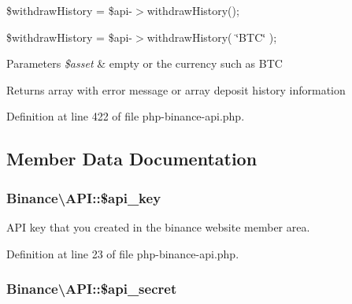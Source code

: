 \$withdraw\-History = \$api-\/$>$withdraw\-History();

\$withdraw\-History = \$api-\/$>$withdraw\-History( \char`\"{}\-B\-T\-C\char`\"{} );


\begin{DoxyParams}{Parameters}
{\em \$asset} & empty or the currency such as B\-T\-C \\
\hline
\end{DoxyParams}
\begin{DoxyReturn}{Returns}
array with error message or array deposit history information 
\end{DoxyReturn}


Definition at line 422 of file php-\/binance-\/api.\-php.



\subsection{Member Data Documentation}
\hypertarget{classBinance_1_1API_a4b70fc1796d52440e44423da2cbafca5}{
\subsubsection[{\$api\-\_\-key}]{\setlength{\rightskip}{0pt plus 5cm}Binance\textbackslash{}\-A\-P\-I\-::\$api\-\_\-key\hspace{0.3cm}{\ttfamily [protected]}}}\label{classBinance_1_1API_a4b70fc1796d52440e44423da2cbafca5}


A\-P\-I key that you created in the binance website member area. 



Definition at line 23 of file php-\/binance-\/api.\-php.

\hypertarget{classBinance_1_1API_a5612f3068ec5843031812893537e7677}{
\subsubsection[{\$api\-\_\-secret}]{\setlength{\rightskip}{0pt plus 5cm}Binance\textbackslash{}\-A\-P\-I\-::\$api\-\_\-secret\hspace{0.3cm}{\ttfamily [protected]}}}\label{classBinance_1_1API_a5612f3068ec5843031812893537e7677}


